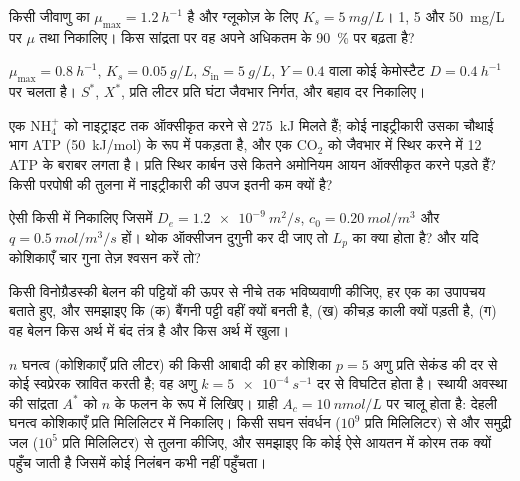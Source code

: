 \begin{exercise}[$\star\star$]\label{exo:b2:microbial-metabolism:6}
किसी जीवाणु का $\mu_{\max} = \qty{1.2}{h^{-1}}$ है और ग्लूकोज़ के लिए $K_s =
\qty{5}{mg/L}$। 1, 5 और \qty{50}{mg/L} पर $\mu$ तथा
 निकालिए। किस सांद्रता पर वह अपने अधिकतम के
\qty{90}{\%} पर बढ़ता है?
\end{exercise}

\begin{exercise}[$\star\star$]\label{exo:b2:microbial-metabolism:7}
$\mu_{\max} = \qty{0.8}{h^{-1}}$, $K_s =
\qty{0.05}{g/L}$, $S_{\mathrm{in}} = \qty{5}{g/L}$, $Y = 0.4$ वाला कोई
केमोस्टैट $D = \qty{0.4}{h^{-1}}$ पर चलता है। $S^*$, $X^*$, प्रति
लीटर प्रति घंटा जैवभार निर्गत, और बहाव दर निकालिए।
\end{exercise}

\begin{exercise}[$\star\star$]\label{exo:b2:microbial-metabolism:8}
एक $\mathrm{NH_4^+}$ को नाइट्राइट तक ऑक्सीकृत करने से \qty{275}{kJ}
मिलते हैं; कोई नाइट्रीकारी उसका चौथाई भाग ATP (\qty{50}{kJ/mol}) के रूप
में पकड़ता है, और एक $\mathrm{CO_2}$ को जैवभार में स्थिर करने में 12
ATP के बराबर लगता है। प्रति स्थिर कार्बन उसे कितने अमोनियम आयन ऑक्सीकृत
करने पड़ते हैं? किसी परपोषी की तुलना में नाइट्रीकारी की उपज इतनी कम
क्यों है?
\end{exercise}

\begin{exercise}[$\star\star$]\label{exo:b2:microbial-metabolism:9}
 ऐसी किसी  में निकालिए जिसमें $D_e =
\qty{1.2e-9}{m^2/s}$, $c_0 = \qty{0.20}{mol/m^3}$ और $q =
\qty{0.5}{mol/m^3/s}$ हों। थोक ऑक्सीजन दुगुनी कर दी जाए तो $L_p$ का
क्या होता है? और यदि कोशिकाएँ चार गुना तेज़ श्वसन करें तो?
\end{exercise}

\begin{exercise}[$\star\star\star$]\label{exo:b2:microbial-metabolism:10}
किसी विनोग्रैडस्की बेलन की पट्टियों की ऊपर से नीचे तक भविष्यवाणी कीजिए,
हर एक का उपापचय बताते हुए, और समझाइए कि (क) बैंगनी पट्टी वहीं क्यों
बनती है, (ख) कीचड़ काली क्यों पड़ती है, (ग) वह बेलन किस अर्थ में बंद
तंत्र है और किस अर्थ में खुला।
\end{exercise}

\begin{exercise}[$\star\star\star$]\label{exo:b2:microbial-metabolism:11}
$n$ घनत्व (कोशिकाएँ प्रति लीटर) की किसी आबादी की हर कोशिका
$p = 5$ अणु प्रति सेकंड की दर से कोई स्वप्रेरक स्रावित करती है; वह अणु
$k = \qty{5e-4}{s^{-1}}$ दर से विघटित होता है। स्थायी अवस्था की
सांद्रता $A^*$ को $n$ के फलन के रूप में लिखिए। ग्राही
$A_c = \qty{10}{nmol/L}$ पर चालू होता है: देहली घनत्व कोशिकाएँ प्रति
मिलिलिटर में निकालिए। किसी सघन संवर्धन ($10^{9}$ प्रति मिलिलिटर) से और
समुद्री जल ($10^{5}$ प्रति मिलिलिटर) से तुलना कीजिए, और समझाइए कि कोई
 ऐसे आयतन में कोरम तक क्यों पहुँच जाती है जिसमें कोई निलंबन
कभी नहीं पहुँचता।
\end{exercise}


